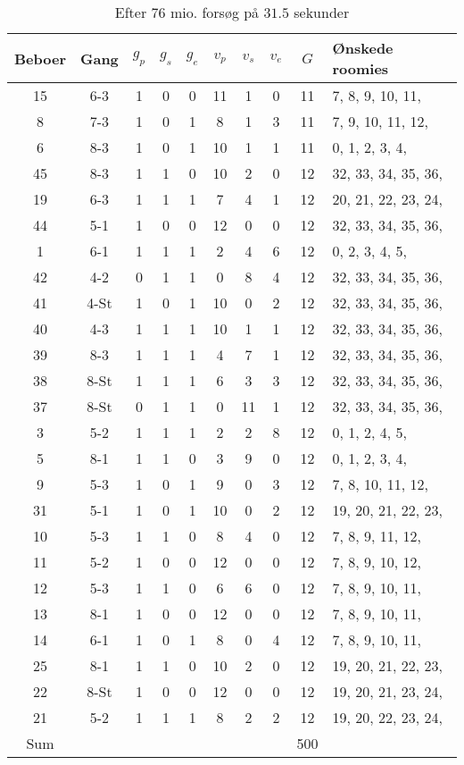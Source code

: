 \documentclass[article,oneside,11pt,a4paper]{memoir}
\newenvironment{assignment}[1]{
\begin{table}[h]
\caption{#1}
\footnotesize
\begin{center}
\begin{tabular}{cccccccccl}
\toprule
Beboer & Gang & $g_p$ & $g_s$ & $g_e$ & $v_p$ & $v_s$ & $v_e$ & $G$ & Ønskede roomies \\ \midrule
}{
\bottomrule
\end{tabular}
\end{center}
\end{table}

}
\begin{document}
\begin{assignment}{Efter 76 mio. forsøg på $31.5$ sekunder}
    15 & 6-3  &   1 &   0 &   0 &  11 &   1 &   0 & 11 &   7,  8,  9, 10, 11, \\
     8 & 7-3  &   1 &   0 &   1 &   8 &   1 &   3 & 11 &   7,  9, 10, 11, 12, \\
     6 & 8-3  &   1 &   0 &   1 &  10 &   1 &   1 & 11 &   0,  1,  2,  3,  4, \\
    45 & 8-3  &   1 &   1 &   0 &  10 &   2 &   0 & 12 &  32, 33, 34, 35, 36, \\
    19 & 6-3  &   1 &   1 &   1 &   7 &   4 &   1 & 12 &  20, 21, 22, 23, 24, \\
    44 & 5-1  &   1 &   0 &   0 &  12 &   0 &   0 & 12 &  32, 33, 34, 35, 36, \\
     1 & 6-1  &   1 &   1 &   1 &   2 &   4 &   6 & 12 &   0,  2,  3,  4,  5, \\
    42 & 4-2  &   0 &   1 &   1 &   0 &   8 &   4 & 12 &  32, 33, 34, 35, 36, \\
    41 & 4-St &   1 &   0 &   1 &  10 &   0 &   2 & 12 &  32, 33, 34, 35, 36, \\
    40 & 4-3  &   1 &   1 &   1 &  10 &   1 &   1 & 12 &  32, 33, 34, 35, 36, \\
    39 & 8-3  &   1 &   1 &   1 &   4 &   7 &   1 & 12 &  32, 33, 34, 35, 36, \\
    38 & 8-St &   1 &   1 &   1 &   6 &   3 &   3 & 12 &  32, 33, 34, 35, 36, \\
    37 & 8-St &   0 &   1 &   1 &   0 &  11 &   1 & 12 &  32, 33, 34, 35, 36, \\
     3 & 5-2  &   1 &   1 &   1 &   2 &   2 &   8 & 12 &   0,  1,  2,  4,  5, \\
     5 & 8-1  &   1 &   1 &   0 &   3 &   9 &   0 & 12 &   0,  1,  2,  3,  4, \\
     9 & 5-3  &   1 &   0 &   1 &   9 &   0 &   3 & 12 &   7,  8, 10, 11, 12, \\
    31 & 5-1  &   1 &   0 &   1 &  10 &   0 &   2 & 12 &  19, 20, 21, 22, 23, \\
    10 & 5-3  &   1 &   1 &   0 &   8 &   4 &   0 & 12 &   7,  8,  9, 11, 12, \\
    11 & 5-2  &   1 &   0 &   0 &  12 &   0 &   0 & 12 &   7,  8,  9, 10, 12, \\
    12 & 5-3  &   1 &   1 &   0 &   6 &   6 &   0 & 12 &   7,  8,  9, 10, 11, \\
    13 & 8-1  &   1 &   0 &   0 &  12 &   0 &   0 & 12 &   7,  8,  9, 10, 11, \\
    14 & 6-1  &   1 &   0 &   1 &   8 &   0 &   4 & 12 &   7,  8,  9, 10, 11, \\
    25 & 8-1  &   1 &   1 &   0 &  10 &   2 &   0 & 12 &  19, 20, 21, 22, 23, \\
    22 & 8-St &   1 &   0 &   0 &  12 &   0 &   0 & 12 &  19, 20, 21, 23, 24, \\
    21 & 5-2  &   1 &   1 &   1 &   8 &   2 &   2 & 12 &  19, 20, 22, 23, 24, \\
\midrule
Sum &&&&&&&& 500 & \\
\end{assignment}
\end{document}
